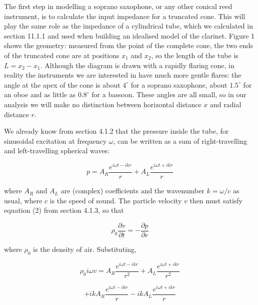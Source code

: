   The first step in modelling a soprano saxophone, or any other conical reed 
  instrument, is to calculate the input impedance for a truncated cone. This 
  will play the same role as the impedance of a cylindrical tube, which we 
  calculated in section 11.1.1 and used when building an idealised model of the 
  clarinet. Figure 1 shows the geometry: measured from the point of the 
  complete cone, the two ends of the truncated cone are at positions $x_1$ and 
  $x_2$, so the length of the tube is $L=x_2-x_1$. Although the diagram is 
  drawn with a rapidly flaring cone, in reality the instruments we are 
  interested in have much more gentle flares: the angle at the apex of the cone 
  is about $4^\circ$ for a soprano saxophone, about $1.5^\circ$ for an oboe and 
  as little as $0.8^\circ$ for a bassoon. These angles are all small, so in our 
  analysis we will make no distinction between horizontal distance $x$ and 
  radial distance $r$. 


  We already know from section 4.1.2 that the pressure inside the tube, for 
  sinusoidal excitation at frequency $\omega$, can be written as a sum of 
  right-travelling and left-travelling spherical waves: 

  \begin{equation*}p=A_R \dfrac{e^{i \omega t -ikr}}{r} + A_L \dfrac{e^{i 
  \omega t +ikr}}{r} \tag{1}\end{equation*} 

  \noindent{}where $A_R$ and $A_L$ are (complex) coefficients and the 
  wavenumber $k=\omega/c$ as usual, where $c$ is the speed of sound. The 
  particle velocity $v$ then must satisfy equation (2) from section 4.1.3, so 
  that 

  \begin{equation*}\rho_0\dfrac{\partial v}{\partial t}=-\dfrac{\partial 
  p}{\partial r} \tag{2}\end{equation*} 

  \noindent{}where $\rho_0$ is the density of air. Substituting, 

  \begin{equation*}\rho_0 i \omega v = A_R \dfrac{e^{i \omega t -ikr}}{r^2} + 
  A_L \dfrac{e^{i \omega t +ikr}}{r^2}\end{equation*} 

  \begin{equation*}+ ik A_R\dfrac{e^{i \omega t -ikr}}{r}- ik A_L\dfrac{e^{i 
  \omega t +ikr}}{r} \tag{3}\end{equation*} 


